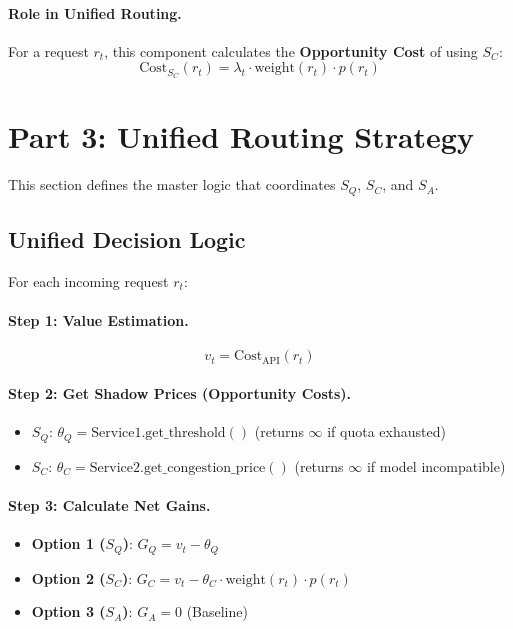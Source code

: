 \documentclass[11pt]{article}
\begin{document}
\paragraph{Role in Unified Routing.}
For a request $r_t$, this component calculates the \textbf{Opportunity Cost} of using $S_C$:
\[ \text{Cost}_{S_C}(r_t) = \lambda_t \cdot \text{weight}(r_t) \cdot p(r_t) \]

\section{Part 3: Unified Routing Strategy}
\label{sec:part3}

This section defines the master logic that coordinates $S_Q$, $S_C$, and $S_A$.

\subsection{Unified Decision Logic}

For each incoming request $r_t$:

\paragraph{Step 1: Value Estimation.}
\[ v_t = \text{Cost}_{\text{API}}(r_t) \]

\paragraph{Step 2: Get Shadow Prices (Opportunity Costs).}
\begin{itemize}
  \item $S_Q$: $\theta_Q = \text{Service1.get\_threshold}()$ (returns $\infty$ if quota exhausted)
  \item $S_C$: $\theta_C = \text{Service2.get\_congestion\_price}()$ (returns $\infty$ if model incompatible)
\end{itemize}

\paragraph{Step 3: Calculate Net Gains.}
\begin{itemize}
  \item \textbf{Option 1 ($S_Q$)}: $G_Q = v_t - \theta_Q$
  \item \textbf{Option 2 ($S_C$)}: $G_C = v_t - \theta_C \cdot \text{weight}(r_t) \cdot p(r_t)$
  \item \textbf{Option 3 ($S_A$)}: $G_A = 0$ (Baseline)
\end{itemize}
\end{document}

